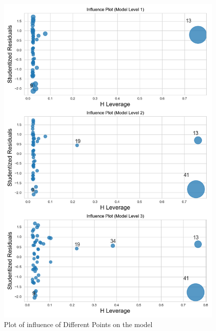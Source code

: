 \documentclass[11pt, oneside]{article}   	%
\begin{document}
\begin{figure}[H]
    \begin{center}
    \includegraphics[width=0.5\linewidth]{../plots/full_data/hierarchy8/influence}
    \caption{Plot of influence of Different Points on the model}
    \end{center}
\end{figure}
\end{document}
